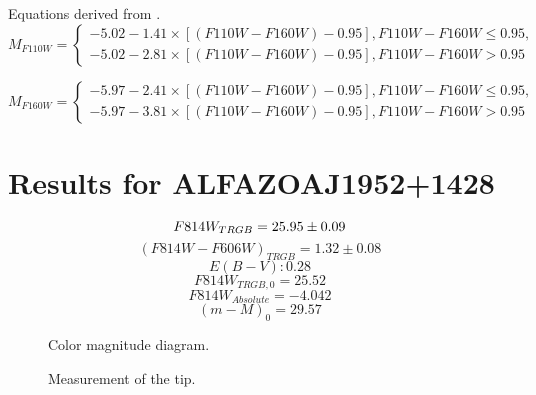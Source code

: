 \documentclass[12,manuscript,usenatbib]{aastex}
\begin{document}
Equations derived from \citet{2014AJ....148....7W}.
\begin{equation}
M_{F110W}=\left\{\begin{matrix}
-5.02 -1.41 \times [(F110W-F160W)-0.95], F110W-F160W \leqslant 0.95,
\\ 
-5.02 -2.81 \times[(F110W-F160W)-0.95], F110W-F160W > 0.95
\end{matrix}\right.
\end{equation}

\begin{equation}
M_{F160W}=\left\{\begin{matrix}
-5.97 -2.41 \times [(F110W-F160W)-0.95], F110W-F160W \leqslant 0.95,
\\ 
-5.97 -3.81 \times[(F110W-F160W)-0.95], F110W-F160W > 0.95
\end{matrix}\right.
\end{equation}




\section{Results for ALFAZOAJ1952+1428}

\begin{equation}
F814W_{TRGB}=25.95 \pm 0.09 \\
\end{equation}
\begin{equation}
(F814W-F606W)_{TRGB}=1.32 \pm 0.08
\end{equation}
\begin{equation}
E(B-V): 0.28
\end{equation}
\begin{equation}
F814W_{TRGB,0} = 25.52
\end{equation}
\begin{equation}
F814W_{Absolute} = -4.042
\end{equation}
\begin{equation}
(m-M)_0=29.57
\end{equation}

\begin{figure}
\caption{Color magnitude diagram.\label{cmd1}}
\end{figure}

\begin{figure}
\caption{Measurement of the tip.\label{lf1}}
\end{figure}
\end{document}
